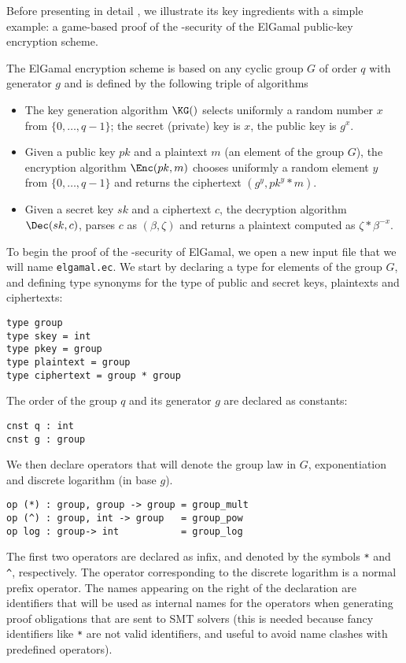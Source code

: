 Before presenting in detail \EasyCrypt, we illustrate its key
ingredients with a simple example: a game-based proof of
the \INDCPA-security of the ElGamal public-key encryption scheme.

The ElGamal encryption scheme is based on any cyclic group $G$ of
order $q$ with generator $g$ and is defined by the following triple of
algorithms

\begin{itemize} 
\item The key generation algorithm $\KG()$ selects uniformly a random
      number $x$ from $\{0,\ldots,q-1\}$; the secret (private) key is
      $x$, the public key is $g^x$.

\item Given a public key $pk$ and a plaintext $m$ (an element of the
      group $G$), the encryption algorithm $\Enc(pk, m)$ chooses
      uniformly a random element $y$ from $\{0,\ldots,q-1\}$ and
      returns the ciphertext $(g^y, pk^y * m)$.

\item Given a secret key $sk$ and a ciphertext $c$, 
      the decryption algorithm $\Dec(sk, c)$, parses $c$ as
      $(\beta,\zeta)$ and returns a plaintext computed as
      $\zeta * \beta^{-x}$.
\end{itemize}

To begin the proof of the \INDCPA-security of ElGamal, we open a new
input file that we will name \verb|elgamal.ec|. We start by declaring
a type for elements of the group $G$, and defining type synonyms for
the type of public and secret keys, plaintexts and ciphertexts:
%
\begin{verbatim} 
type group 
type skey = int 
type pkey = group 
type plaintext = group 
type ciphertext = group * group 
\end{verbatim} 
%
The order of the group $q$ and its generator $g$ are declared as
constants:
%

\begin{verbatim}
cnst q : int
cnst g : group
\end{verbatim}

%
We then declare operators that will denote the group law in $G$,
exponentiation and discrete logarithm (in base $g$).
%
\begin{verbatim}
op (*) : group, group -> group = group_mult
op (^) : group, int -> group   = group_pow
op log : group-> int           = group_log
\end{verbatim}
%
The first two operators are declared as infix, and denoted by the
symbols \verb|*| and \verb|^|, respectively. The operator
corresponding to the discrete logarithm is a normal prefix
operator. The names appearing on the right of the declaration are
identifiers that will be used as internal names for the operators when
generating proof obligations that are sent to SMT solvers (this is
needed because fancy identifiers like \verb|*| are not valid
identifiers, and useful to avoid name clashes with predefined
operators).

